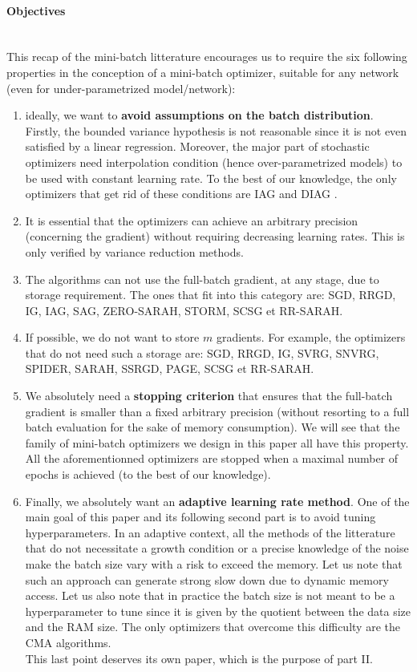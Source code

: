 \paragraph{Objectives}
~~\\
This recap of the mini-batch litterature encourages us to require the six following properties in the conception of a mini-batch optimizer, suitable for any network (even for under-parametrized model/network):
\begin{enumerate}
	\item ideally, we want to \textbf{avoid assumptions on the batch distribution}. Firstly, the bounded variance hypothesis is not reasonable 
          since it is not even satisfied by a linear regression. Moreover, the major part of stochastic optimizers need interpolation condition (hence over-parametrized models) to be used with constant learning rate. To the best of our knowledge, the only optimizers that get rid of these conditions are IAG and DIAG \cite{DIAG}.
	\item It is essential that the optimizers can achieve an arbitrary precision (concerning the gradient) without requiring decreasing learning rates. This is only verified by variance reduction methods. 
	\item The algorithms can not use the full-batch gradient, at any stage, due to storage requirement. The ones that fit into this category are: SGD, RRGD, IG, IAG, SAG, ZERO-SARAH, STORM, SCSG et RR-SARAH.
	\item If possible, we do not want to store $m$ gradients. For example, the optimizers that do not need such a storage are:  SGD, RRGD, IG, SVRG, SNVRG, SPIDER, SARAH, SSRGD, PAGE, SCSG et RR-SARAH.
        \item We absolutely need a \textbf{stopping criterion} that ensures that the full-batch gradient is smaller than a fixed arbitrary precision (without resorting to a full
          batch evaluation for the sake of memory consumption). 
          We will see that the family of mini-batch optimizers we design in this paper all have this property. 
          All the aforementionned
          optimizers are stopped when a maximal number of epochs is achieved (to the best of our knowledge).
        \item Finally, we absolutely want an \textbf{adaptive learning rate method}. 
          One of the main goal of this paper and its following second part is to avoid tuning hyperparameters. In an adaptive context, all the methods of the litterature that do not necessitate a growth condition or a precise knowledge of the noise make the batch size vary with a risk to exceed the memory. Let us note that such an approach can generate strong slow down due to dynamic memory access. Let us also note that in practice the batch size is not meant to be a hyperparameter to tune since it is given by the quotient between the data size and the RAM size. The only optimizers that overcome this difficulty are the CMA algorithms. \\
          This last point deserves its own paper, which is the purpose of part II.
\end{enumerate}
